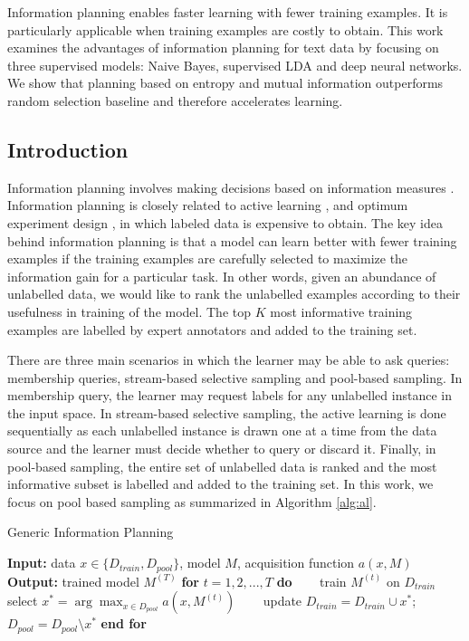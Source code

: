 
Information planning enables faster learning with fewer training examples. It is particularly applicable when training examples are costly to obtain. This work examines the advantages of information planning for text data by focusing on three supervised models: Naive Bayes, supervised LDA and deep neural networks. We show that planning based on entropy and mutual information outperforms random selection baseline and therefore accelerates learning. 

\subsection{Introduction}

Information planning involves making decisions based on information measures \cite{CoverBook}. Information planning is closely related to active learning \cite{Settles2009}, \cite{Olsson2009} and optimum experiment design \cite{FederovBook}, \cite{Chaloner1995} in which labeled data is expensive to obtain. The key idea behind information planning is that a model can learn better with fewer training examples if the training examples are carefully selected to maximize the information gain for a particular task. In other words, given an abundance of unlabelled data, we would like to rank the unlabelled examples according to their usefulness in training of the model. The top $K$ most informative training examples are labelled by expert annotators and added to the training set.

There are three main scenarios in which the learner may be able to ask queries: membership queries, stream-based selective sampling and pool-based sampling. In membership query, the learner may request labels for any unlabelled instance in the input space. In stream-based selective sampling, the active learning is done sequentially as each unlabelled instance is drawn one at a time from the data source and the learner must decide whether to query or discard it. Finally, in pool-based sampling, the entire set of unlabelled data is ranked and the most informative subset is labelled and added to the training set. In this work, we focus on pool based sampling as summarized in Algorithm \ref{alg:al}.

\begin{algorithm}[t]
\caption{Generic Information Planning}
\label{alg:al}
\begin{algorithmic}[1]
\STATE \textbf{Input:} data $x \in \{D_{train}, D_{pool}\}$, model $M$, acquisition function $a(x, M)$ 
\STATE \textbf{Output:} trained model $M^{(T)}$ 
\STATE \textbf{for} $t = 1,2,...,T$ \textbf{do}
\STATE ~~~ train $M^{(t)}$ on $D_{train}$ 
\STATE ~~~ select $x^{\ast} = \arg \max_{x \in D_{pool}} a(x, M^{(t)})$ 
\STATE ~~~ update $D_{train} = D_{train}\cup x^{\ast}$; $D_{pool} = D_{pool} \setminus x^{\ast}$
\STATE \textbf{end for}
\end{algorithmic}
\end{algorithm}

